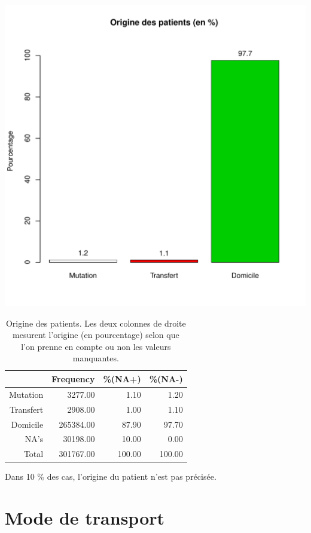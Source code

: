 \documentclass[12pt,english,french,twoside]{report}\usepackage[]{graphicx}\usepackage[]{color}
\makeatletter
\def\maxwidth{ %
  \ifdim\Gin@nat@width>\linewidth
    \linewidth
  \else
    \Gin@nat@width
  \fi
}
\makeatother
\begin{document}
\includegraphics[width=\maxwidth]{figure/mode_entree} 
\begin{table}[ht]
\centering
\begin{tabular}{rrrr}
  \hline
 & Frequency &   \%(NA+) &   \%(NA-) \\ 
  \hline
Mutation & 3277.00 & 1.10 & 1.20 \\ 
  Transfert & 2908.00 & 1.00 & 1.10 \\ 
  Domicile & 265384.00 & 87.90 & 97.70 \\ 
  NA's & 30198.00 & 10.00 & 0.00 \\ 
    Total & 301767.00 & 100.00 & 100.00 \\ 
   \hline
\end{tabular}
\caption[Origine des patients]{Origine des patients. Les deux colonnes de droite mesurent l'origine (en pourcentage) selon que l'on prenne en compte ou non les valeurs manquantes. } 
\label{origine}
\end{table}



Dans 10 \% des cas, l'origine du patient n'est pas précisée.

\section*{Mode de transport}
\end{document}
